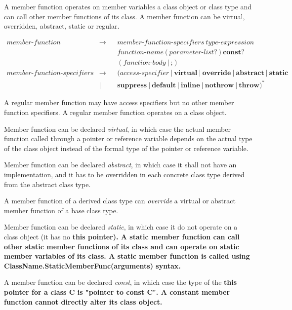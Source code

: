 \documentclass[a4paper,oneside,11pt]{article}
\begin{document}
A member function operates on member variables a class object or class type and can call
other member functions of its class.
A member function can be virtual, overridden, abstract, static or regular.

\begin{align*}
member\textrm{-}function &\rightarrow & &member\textrm{-}function\textrm{-}specifiers \> \hyperref[typeexpr]{type\textrm{-}expression}\\
& & &\hyperref[functionname]{function\textrm{-}name} \> \texttt{(} \> \hyperref[parameterlist]{parameter\textrm{-}list}? \> \texttt{)} \> \textbf{const}?\\
& & &(\hyperref[functionbody]{function\textrm{-}body} \> | \> \texttt{;})\\
member\textrm{-}function\textrm{-}specifiers &\rightarrow & &(\hyperref[accessspecifier]{access\textrm{-}specifier} \> | \> \textbf{virtual} \>
| \> \textbf{override} \> | \> \textbf{abstract} \> | \> \textbf{static} \>\\
&| & &\textbf{suppress} \> | \> \textbf{default} \> | \> \textbf{inline} \> | \> \textbf{nothrow} \> | \> \textbf{throw})^*
\end{align*}

A regular member function may have access specifiers but no other member function specifiers.
A regular member function operates on a class object.

Member function can be declared \emph{virtual}, in which case the actual member function called
through a pointer or reference variable depends on the actual type of the class object
instead of the formal type of the pointer or reference variable.

Member function can be declared \emph{abstract}, in which case it shall not have an implementation,
and it has to be overridden in each concrete class type derived from the abstract class type.

A member function of a derived class type can \emph{override} a virtual or abstract member function
of a base class type.

Member function can be declared \emph{static}, in which case it do not operate on a class object
(it has no \bf{this} pointer).
A static member function can call other static member functions of its class and can operate on
static member variables of its class.
A static member function is called using ClassName.StaticMemberFunc(arguments) syntax.

A member function can be declared \emph{const}, in which case the type of the \bf{this} pointer
for a class C is "pointer to \bf{const} C".
A constant member function cannot directly alter its class object.
\end{document}
